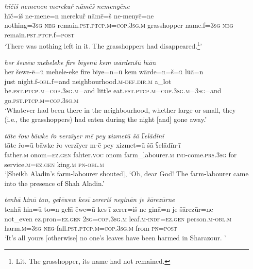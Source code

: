 \ea \label{PM.26}
\textit{ħīčiš nemenen merekuř nāmēš nemenyēne} \\ 
\gll ħīč=iš ne-mene=n merekuř nāmē=š ne-menyē=ne \\ 
 nothing\textsc{=3sg} \textsc{neg-}remain\textsc{.pst}\textsc{.ptcp}\textsc{.m}\textsc{=cop}\textsc{.3sg}\textsc{.m} grasshopper name.f\textsc{=3sg} \textsc{neg-}remain\textsc{.pst}\textsc{.ptcp}.f\textsc{=\textsc{post}} \\ 
\glt `There was nothing left in it. The grasshoppers had disappeared.\footnote{Lit. The grasshopper, its name had not remained.}'
\z 
 
\ea \label{PM.27}
\textit{her šewēw meheleke fire bīyenū kem wārdenšū lūān} \\ 
\gll her šewe-ē=ū mehele-eke fire bīye=n=ū kem wārde=n=š=ū lūā=n \\ 
 just night.f\textsc{-obl}.f=and neighbourhood\textsc{.m}\textsc{-def}\textsc{.dir}\textsc{.m} a\_lot be\textsc{.pst}\textsc{.ptcp}\textsc{.m}\textsc{=cop}\textsc{.3sg}\textsc{.m}=and little eat\textsc{.pst}\textsc{.ptcp}\textsc{.m}\textsc{=cop}\textsc{.3sg}\textsc{.m}\textsc{=3sg}=and go\textsc{.pst}\textsc{.ptcp}\textsc{.m}\textsc{=cop}\textsc{.3sg}\textsc{.m} \\ 
\glt `Whatever had been there in the neighbourhood, whether large or small, they (i.e., the grasshoppers) had eaten during the night [and] gone away.'
\z 
 
\ea \label{PM.28}
\textit{tāte řow bāwke řo verzīyer mē pey xizmetū šā ʕelādīnī} \\ 
\gll tāte řo=ū bāwke řo verzīyer m-ē pey xizmet=ū šā ʕelādīn-ī \\ 
 father\textsc{.m} onom\textsc{\textsc{=ez.gen}} fahter.\textsc{voc} onom farm\_labourer\textsc{.m} \textsc{ind-}come\textsc{.prs}\textsc{.3sg} for service\textsc{.m}\textsc{\textsc{=ez.gen}} king\textsc{.m} \textsc{pn}\textsc{-obl}\textsc{.m} \\ 
\glt `[Sheikh Aladin’s farm-labourer shouted], ‘Oh, dear God! The farm-labourer came into the presence of Shah Aladin.'
\z 
 
\ea \label{PM.31}
\textit{tenhā hinū ton, geɫēwew kesī zereriš neginān je šārezūrne} \\ 
\gll tenhā hin=ū to=n geɫā-ēwe=ū kes-ī zerer=iš ne-ginā=n je šārezūr=ne \\ 
 not\_even ez.pron\textsc{\textsc{=ez.gen}} \textsc{2sg}\textsc{=cop}\textsc{.3sg}\textsc{.m} leaf\textsc{.m}\textsc{-indf}\textsc{\textsc{=ez.gen}} person\textsc{.m}\textsc{-obl}\textsc{.m} harm\textsc{.m}\textsc{=3sg} \textsc{neg-}fall\textsc{.pst}\textsc{.ptcp}\textsc{.m}\textsc{=cop}\textsc{.3sg}\textsc{.m} from \textsc{pn}\textsc{=\textsc{post}} \\ 
\glt `It’s all yours [otherwise] no one’s leaves have been harmed in Sharazour. '
\z 
 
